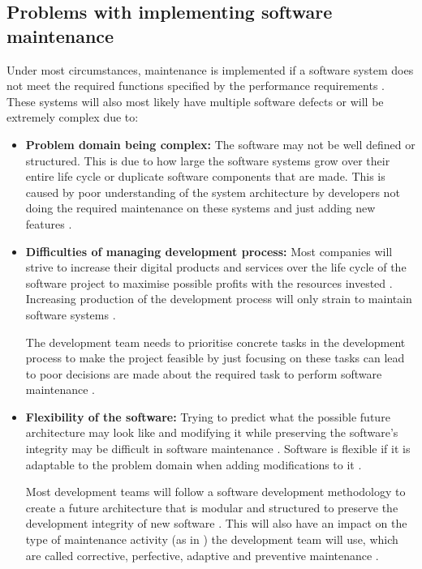 \subsection{Problems with implementing software maintenance}\label{sec:Maintenance_problems}

Under most circumstances, maintenance is implemented if a software system does not meet the required functions specified by the performance requirements \cite{Ogheneovo2014, Sneed2004}. These systems will also most likely have multiple software defects or will be extremely complex due to:

\begin{itemize}
	\item \textbf{Problem domain being complex:} The software may not be well defined or structured. This is due to how large the software systems grow over their entire life cycle or duplicate software components that are made. This is caused by poor understanding of the system architecture by developers not doing the required maintenance on these systems and just adding new features \cite{Galster2019, Booch1986}.
	\item \textbf{Difficulties of managing development process:} Most companies will strive to increase their digital products and services over the life cycle of the software project to maximise possible profits with the resources invested \cite{Niu2018}. Increasing production of the development process will only strain to maintain software systems \cite{Sneed2004}.\par The development team needs to prioritise concrete tasks in the development process to make the project feasible by just focusing on these tasks can lead to poor decisions are made about the required task to perform software maintenance \cite{Galster2019, Ogheneovo2014, Lenarduzzi2017}. 
	\item \textbf{Flexibility of the software:} Trying to predict what the possible future architecture may look like and modifying it while preserving the software's integrity may be difficult in software maintenance \cite{Garlan1999}. Software is flexible if it is adaptable to the problem domain when adding modifications to it \cite{Ogheneovo2014}.\par Most development teams will follow a software development methodology to create a future architecture that is modular and structured to preserve the development integrity of new software \cite{Vijayasarathy2016, Rehman2018}. This will also have an impact on the type of maintenance activity (as in ) the development team will use, which are called corrective, perfective, adaptive and preventive maintenance \cite{FrancisThamburaj2017, Hasan2012, Stojanov2017, Snipes2018}.

\end{itemize}

